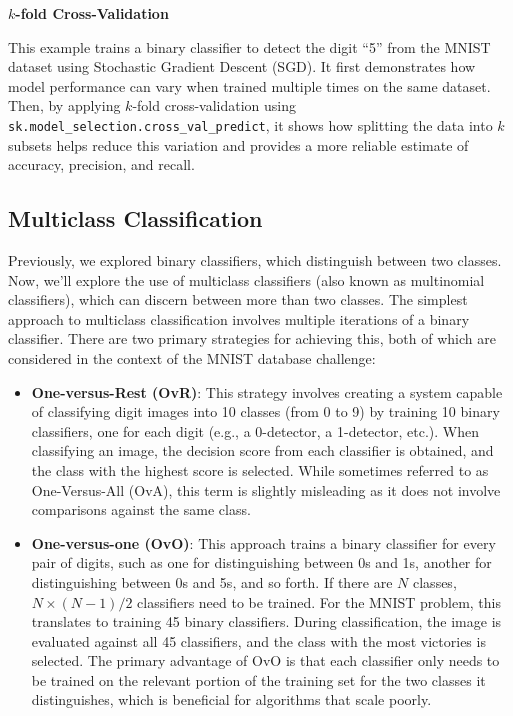 \documentclass[12pt,letter]{article}
\begin{document}
\begin{example}
\textbf{$k$-fold Cross-Validation}
 
\noindent This example trains a binary classifier to detect the digit ``5'' from the MNIST dataset using Stochastic Gradient Descent (SGD). It first demonstrates how model performance can vary when trained multiple times on the same dataset. Then, by applying $k$-fold cross-validation using \texttt{sk.model\_selection.cross\_val\_predict}, it shows how splitting the data into $k$ subsets helps reduce this variation and provides a more reliable estimate of accuracy, precision, and recall.
\end{example}

\subsection{Multiclass Classification}
Previously, we explored binary classifiers, which distinguish between two classes. Now, we'll explore the use of multiclass classifiers (also known as multinomial classifiers), which can discern between more than two classes. The simplest approach to multiclass classification involves multiple iterations of a binary classifier. There are two primary strategies for achieving this, both of which are considered in the context of the MNIST database challenge:

\begin{itemize}
\item \textbf{One-versus-Rest (OvR)}: This strategy involves creating a system capable of classifying digit images into 10 classes (from 0 to 9) by training 10 binary classifiers, one for each digit (e.g., a 0-detector, a 1-detector, etc.). When classifying an image, the decision score from each classifier is obtained, and the class with the highest score is selected. While sometimes referred to as One-Versus-All (OvA), this term is slightly misleading as it does not involve comparisons against the same class.
\item \textbf{One-versus-one (OvO)}: This approach trains a binary classifier for every pair of digits, such as one for distinguishing between 0s and 1s, another for distinguishing between 0s and 5s, and so forth. If there are $N$ classes, $N \times (N - 1) / 2$ classifiers need to be trained. For the MNIST problem, this translates to training 45 binary classifiers. During classification, the image is evaluated against all 45 classifiers, and the class with the most victories is selected. The primary advantage of OvO is that each classifier only needs to be trained on the relevant portion of the training set for the two classes it distinguishes, which is beneficial for algorithms that scale poorly.
\end{itemize}
\end{document}
